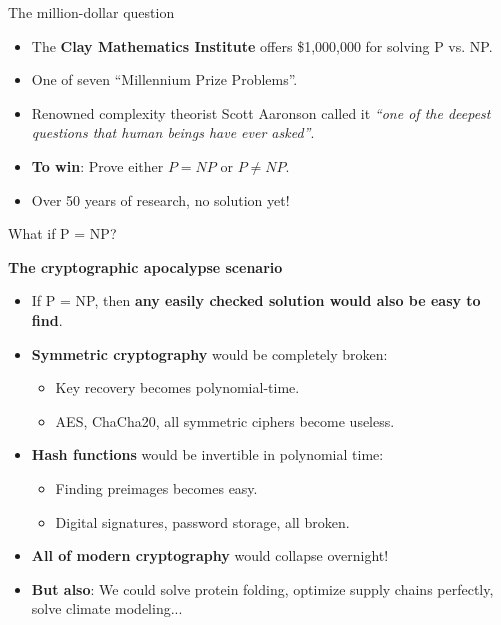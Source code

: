 \documentclass[aspectratio=169, lualatex, handout]{beamer}
\begin{document}
\begin{frame}{The million-dollar question}
	\begin{itemize}[<+->]
		\item The \textbf{Clay Mathematics Institute} offers \$1,000,000 for solving P vs. NP.
		\item One of seven ``Millennium Prize Problems''.
		\item Renowned complexity theorist Scott Aaronson called it \textit{``one of the deepest questions that human beings have ever asked''}.
		\item \textbf{To win}: Prove either $P = NP$ or $P \neq NP$.
		\item Over 50 years of research, no solution yet!
	\end{itemize}
\end{frame}

\begin{frame}{What if P = NP?}
	\begin{center}
		\Large\textbf{The cryptographic apocalypse scenario}
	\end{center}
	\begin{itemize}[<+->]
		\item If P = NP, then \textbf{any easily checked solution would also be easy to find}.
		\item \textbf{Symmetric cryptography} would be completely broken:
		      \begin{itemize}
			      \item Key recovery becomes polynomial-time.
			      \item AES, ChaCha20, all symmetric ciphers become useless.
		      \end{itemize}
		\item \textbf{Hash functions} would be invertible in polynomial time:
		      \begin{itemize}
			      \item Finding preimages becomes easy.
			      \item Digital signatures, password storage, all broken.
		      \end{itemize}
		\item \textbf{All of modern cryptography} would collapse overnight!
		\item \textbf{But also}: We could solve protein folding, optimize supply chains perfectly, solve climate modeling...
	\end{itemize}
\end{frame}
\end{document}
